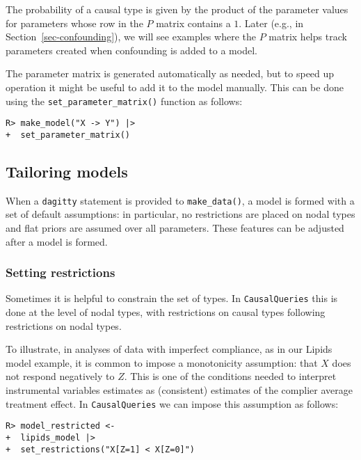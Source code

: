 \documentclass[
  11pt,
  article]{jss}
\begin{document}
The probability of a causal type is given by the product of the
parameter values for parameters whose row in the \(P\) matrix contains a
\(1\). Later (e.g., in Section~\ref{sec-confounding}), we will see
examples where the \(P\) matrix helps track parameters created when
confounding is added to a model.

The parameter matrix is generated automatically as needed, but to speed
up operation it might be useful to add it to the model manually. This
can be done using the \texttt{set\_parameter\_matrix()} function as
follows:

\begin{verbatim}
R> make_model("X -> Y") |> 
+  set_parameter_matrix()
\end{verbatim}

\hypertarget{tailoring-models}{%
\subsection{Tailoring models}\label{tailoring-models}}

When a \texttt{dagitty} statement is provided to \texttt{make\_data()},
a model is formed with a set of default assumptions: in particular, no
restrictions are placed on nodal types and flat priors are assumed over
all parameters. These features can be adjusted after a model is formed.

\hypertarget{restrictions}{%
\subsubsection{Setting restrictions}\label{restrictions}}

Sometimes it is helpful to constrain the set of types. In
\texttt{CausalQueries} this is done at the level of nodal types, with
restrictions on causal types following restrictions on nodal types.

To illustrate, in analyses of data with imperfect compliance, as in our
Lipids model example, it is common to impose a monotonicity assumption:
that \(X\) does not respond negatively to \(Z\). This is one of the
conditions needed to interpret instrumental variables estimates as
(consistent) estimates of the complier average treatment effect. In
\texttt{CausalQueries} we can impose this assumption as follows:

\begin{verbatim}
R> model_restricted <- 
+  lipids_model |> 
+  set_restrictions("X[Z=1] < X[Z=0]")
\end{verbatim}
\end{document}

